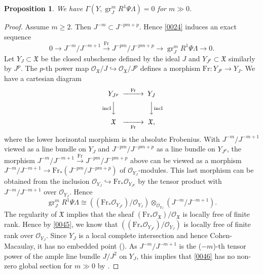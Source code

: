 \documentclass{amsart}
\newtheorem{Prop}[Thm]{Proposition}
\theoremstyle{remark}
\numberwithin{equation}{section}
\newcommand{\Order}{\mathcal{O}}
\newcommand{\into}{\hookrightarrow}
\newcommand{\tensor}{\mathbin{\otimes}}
\newcommand{\Frob}{\mathrm{Fr}}
\DeclareMathOperator{\gr}{gr}
\begin{document}
\begin{Prop} \label{0044}
	We have $\Gamma(Y, \gr_{J}^{m} R^{1} \Psi \Lambda) = 0$ for $m \gg 0$.
\end{Prop}

\begin{proof}
	Assume $m \ge 2$.
	Then $J^{- m} \subset J^{- p m + p}$.
	Hence \eqref{0024} induces an exact sequence
		\[
				0
			\to
				J^{- m} / J^{- m + 1}
			\stackrel{\Frob}{\to}
				J^{- p m} / J^{- p m + p}
			\to
				\gr_{J}^{m} R^{1} \Psi \Lambda
			\to
				0.
		\]
	Let $Y_{J} \subset \mathfrak{X}$ be the closed subscheme defined by the ideal $J$
	and $Y_{J^{p}} \subset \mathfrak{X}$ similarly by $J^{p}$.
	The $p$-th power map $\Order_{\mathfrak{X}} / J \into \Order_{\mathfrak{X}} / J^{p}$
	defines a morphism $\Frob \colon Y_{J^{p}} \to Y_{J}$.
	We have a cartesian diagram
		\begin{equation} \label{0045}
			\begin{CD}
					Y_{J^{p}}
				@> \Frob >>
					Y_{J}
				\\ @V \text{incl} VV @VV \text{incl} V \\
					\mathfrak{X}
				@>> \Frob >
					\mathfrak{X},
			\end{CD}
		\end{equation}
	where the lower horizontal morphism is the absolute Frobenius.
	With $J^{- m} / J^{- m + 1}$ viewed as a line bundle on $Y_{J}$
	and $J^{- p m} / J^{- p m + p}$ as a line bundle on $Y_{J^{p}}$,
	the morphism
		$
				J^{- m} / J^{- m + 1}
			\stackrel{\Frob}{\to}
				J^{- p m} / J^{- p m + p}
		$
	above can be viewed as a morphism
	$J^{- m} / J^{- m + 1} \to \Frob_{\ast}(J^{- p m} / J^{- p m + p})$
	of $\Order_{Y_{J}}$-modules.
	This last morphism can be obtained from the inclusion
	$\Order_{Y_{J}} \into \Frob_{\ast} \Order_{Y_{J^{p}}}$
	by the tensor product with $J^{- m} / J^{- m + 1}$ over $\Order_{Y_{J}}$.
	Hence
		\begin{equation} \label{0046}
				\gr_{J}^{m} R^{1} \Psi \Lambda
			\cong
					((\Frob_{\ast} \Order_{Y_{J^{p}}}) / \Order_{Y_{J}})
				\tensor_{\Order_{Y_{J}}}
					(J^{- m} / J^{- m + 1}).
		\end{equation}
	The regularity of $\mathfrak{X}$ implies that
	the sheaf $(\Frob_{\ast} \Order_{\mathfrak{X}}) / \Order_{\mathfrak{X}}$
	is locally free of finite rank.
	Hence by \eqref{0045}, we know that
	$((\Frob_{\ast} \Order_{Y_{J^{p}}}) / \Order_{Y_{J}})$
	is locally free of finite rank over $\Order_{Y_{J}}$.
	Since $Y_{J}$ is a local complete intersection
	and hence Cohen-Macaulay,
	it has no embedded point (\cite[Tag 0BXG]{Sta22}).
	As $J^{- m} / J^{- m + 1}$ is the ($- m$)-th tensor power
	of the ample line bundle $J / J^{2}$ on $Y_{J}$,
	this implies that
	\eqref{0046} has no non-zero global section for $m \gg 0$
	by \cite[Tag 0FD7]{Sta22}.
\end{proof}
\end{document}
